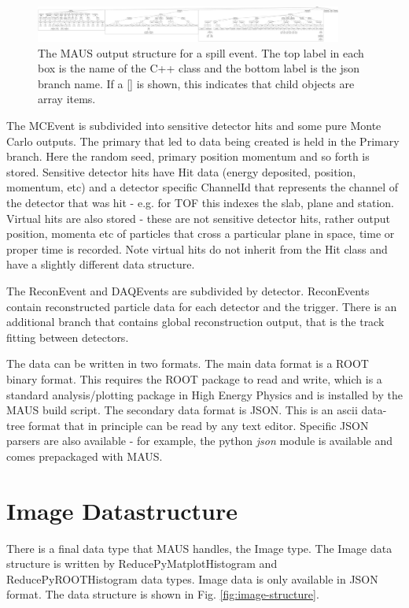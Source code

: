 \begin{figure}[!htbp]
\centering
\includegraphics[width=0.9\textwidth]{spill_structure.png}
\caption{The MAUS output structure for a spill event. The top label in each box is the name of the C++ class and the bottom label is the json branch name. If a [] is shown, this indicates that child objects are array items.}
\end{figure}

The MCEvent is subdivided into sensitive detector hits and some pure Monte Carlo outputs. The primary that led to data being created is held in the Primary branch. Here the random seed, primary position momentum and so forth is stored. Sensitive detector hits have Hit data (energy deposited, position, momentum, etc) and a detector specific ChannelId that represents the channel of the detector that was hit - e.g. for TOF this indexes the slab, plane and station. Virtual hits are also stored - these are not sensitive detector hits, rather output position, momenta etc of particles that cross a particular plane in space, time or proper time is recorded. Note virtual hits do not inherit from the Hit class and have a slightly different data structure.

The ReconEvent and DAQEvents are subdivided by detector. ReconEvents contain reconstructed particle data for each detector and the trigger. There is an additional branch that contains global reconstruction output, that is the track fitting between detectors.

The data can be written in two formats. The main data format is a ROOT binary format. This requires the ROOT package to read and write, which is a standard analysis/plotting package in High Energy Physics and is installed by the MAUS build script. The secondary data format is JSON. This is an ascii data-tree format that in principle can be read by any text editor. Specific JSON parsers are also available - for example, the python \emph{json} module is available and comes prepackaged with MAUS.

\section{Image Datastructure}
There is a final data type that MAUS handles, the Image type. The Image data structure is written by ReducePyMatplotHistogram and ReducePyROOTHistogram data types. Image data is only available in JSON format. The data structure is shown in Fig. \ref{fig:image-structure}.

